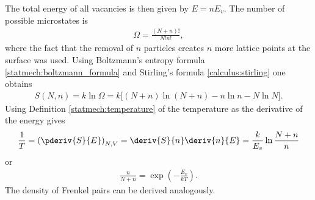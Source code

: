     The total energy of all vacancies is then given by $E = nE_v$. The number of possible microstates is
    \begin{gather}
        \Omega = \frac{(N+n)!}{N!n!},
    \end{gather}
    where the fact that the removal of $n$ particles creates $n$ more lattice points at the surface was used. Using Boltzmann's entropy formula \eqref{statmech:boltzmann_formula} and Stirling's formula \eqref{calculus:stirling} one obtains
    \begin{gather}
        S(N,n) = k\ln\Omega = k\big[(N+n)\ln(N+n) -n\ln n - N\ln N \big].
    \end{gather}
    Using Definition \ref{statmech:temperature} of the temperature as the derivative of the energy gives
    \begin{gather}
        \frac{1}{T} = \left(\pderiv{S}{E}\right)_{N, V} = \deriv{S}{n}\deriv{n}{E} = \frac{k}{E_v}\ln\frac{N+n}{n}
    \end{gather}
    or
    \begin{gather}
        \frac{n}{N + n} = \exp\left(-\frac{E_v}{kT}\right).
    \end{gather}
    The density of Frenkel pairs can be derived analogously.
